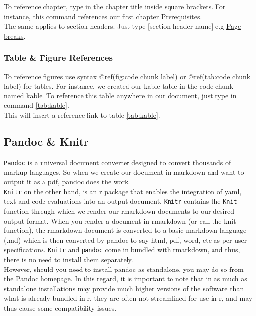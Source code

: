 \documentclass[
]{book}
\begin{document}
To reference chapter, type in the chapter title inside square brackets. For instance, this command references our first chapter \protect\hyperlink{prerequisites}{Prerequisites}.\\
The same applies to section headers. Just type {[}section header name{]} e.g \protect\hyperlink{page-breaks}{Page breaks}.

\hypertarget{table-figure-references}{%
\subsubsection{Table \& Figure References}\label{table-figure-references}}

To reference figures use syntax @ref(fig:code chunk label) or @ref(tab:code chunk label) for tables.
For instance, we created our kable table in the code chunk named kable. To reference this table anywhere in our document, just type in command \ref{tab:kable}.\\
This will insert a reference link to table \ref{tab:kable}.

\hypertarget{pandoc-knitr}{%
\subsection{Pandoc \& Knitr}\label{pandoc-knitr}}

\texttt{Pandoc} is a universal document converter designed to convert thousands of markup languages. So when we create our document in markdown and want to output it as a pdf, pandoc does the work.\\
\texttt{Knitr} on the other hand, is an r package that enables the integration of yaml, text and code evaluations into an output document. \texttt{Knitr} contains the \texttt{Knit} function through which we render our rmarkdown documents to our desired output format.
When you render a document in rmarkdown (or call the knit function), the rmarkdown document is converted to a basic markdown language (.md) which is then converted by pandoc to say html, pdf, word, etc as per user specifications.
\texttt{Knitr} and \texttt{pandoc} come in bundled with rmarkdown, and thus, there is no need to install them separately.\\
However, should you need to install pandoc as standalone, you may do so from the \href{http://pandoc.org}{Pandoc homepage}. In this regard, it is important to note that in as much as standalone installations may provide much higher versions of the software than what is already bundled in r, they are often not streamlined for use in r, and may thus cause some compatibility issues.
\end{document}
